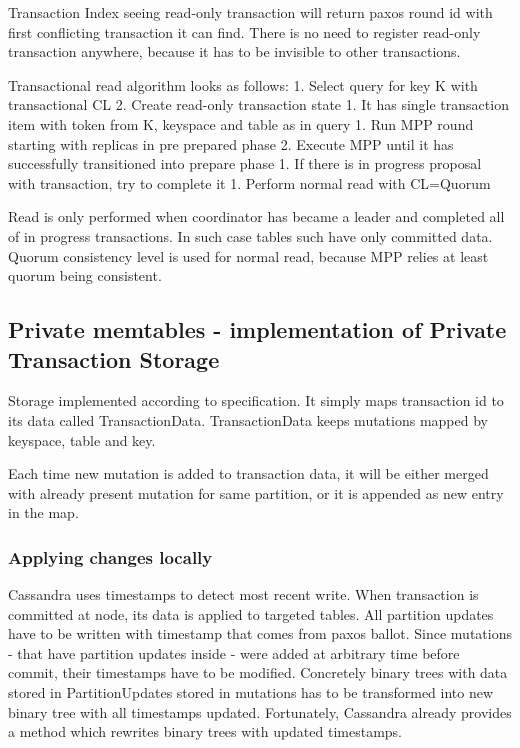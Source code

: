 Transaction Index seeing read-only transaction will return paxos round id with first conflicting transaction it can find. There is no need to register read-only transaction anywhere, because it has to be invisible to other transactions.


Transactional read algorithm looks as follows:
1. Select query for key K with transactional CL
2. Create read-only transaction state
   1. It has single transaction item with token from K, keyspace and table as in query
1. Run MPP round starting with replicas in pre prepared phase
2. Execute MPP until it has successfully transitioned into prepare phase
   1. If there is in progress proposal with transaction, try to complete it
1. Perform normal read with CL=Quorum


Read is only performed when coordinator has became a leader and completed all of in progress transactions. In such case tables such have only committed data. Quorum consistency level is used for normal read, because MPP relies at least quorum being consistent.




\subsection{Private memtables - implementation of Private Transaction Storage}
Storage implemented according to specification. It simply maps transaction id to its data called TransactionData. TransactionData keeps mutations mapped by keyspace, table and key.


Each time new mutation is added to transaction data, it will be either merged with already present mutation for same partition, or it is appended as new entry in the map.


\subsubsection{Applying changes locally}
Cassandra uses timestamps to detect most recent write. When transaction is committed at node, its data is applied to targeted tables. All partition updates have to be written with timestamp that comes from paxos ballot. Since mutations - that have partition updates inside - were added at arbitrary time before commit, their timestamps have to be modified. Concretely binary trees with data stored in PartitionUpdates stored in mutations has to be transformed into new binary tree with all timestamps updated. Fortunately, Cassandra already provides a method which rewrites binary trees with updated timestamps.


